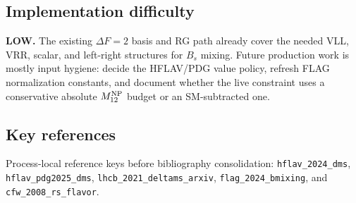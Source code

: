 \subsection*{Implementation difficulty}
\textbf{LOW.}  The existing \(\Delta F=2\) basis and RG path already cover the
needed VLL, VRR, scalar, and left-right structures for \(B_s\) mixing.  Future
production work is mostly input hygiene: decide the HFLAV/PDG value policy,
refresh FLAG normalization constants, and document whether the live constraint
uses a conservative absolute \(M_{12}^{\rm NP}\) budget or an SM-subtracted one.

\subsection*{Key references}
Process-local reference keys before bibliography consolidation:
\texttt{hflav\_2024\_dms}, \texttt{hflav\_pdg2025\_dms},
\texttt{lhcb\_2021\_deltams\_arxiv}, \texttt{flag\_2024\_bmixing}, and
\texttt{cfw\_2008\_rs\_flavor}.
